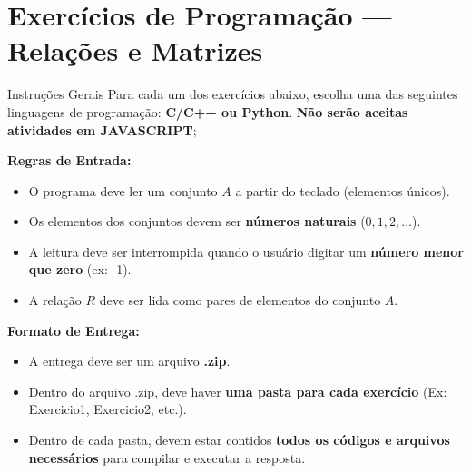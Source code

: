 \documentclass[12pt]{article}
\begin{document}
\vspace*{0.2cm}
\section*{Exercícios de Programação — Relações e Matrizes}

\begin{block}{Instruções Gerais}
Para cada um dos exercícios abaixo, escolha uma das seguintes linguagens de programação: \textbf{C/C++ ou Python}. 
\textbf{Não serão aceitas atividades em JAVASCRIPT};

\textbf{Regras de Entrada:}
\begin{itemize}
    \item O programa deve ler um conjunto $A$ a partir do teclado (elementos únicos).
    \item Os elementos dos conjuntos devem ser \textbf{números naturais} ($0, 1, 2, \dots$).
    \item A leitura deve ser interrompida quando o usuário digitar um \textbf{número menor que zero} (ex: -1).
    \item A relação $R$ deve ser lida como pares de elementos do conjunto $A$.
\end{itemize}

\textbf{Formato de Entrega:}
\begin{itemize}
    \item A entrega deve ser um arquivo \textbf{.zip}.
    \item Dentro do arquivo .zip, deve haver \textbf{uma pasta para cada exercício} (Ex: Exercicio1, Exercicio2, etc.).
    \item Dentro de cada pasta, devem estar contidos \textbf{todos os códigos e arquivos necessários} para compilar e executar a resposta.
\end{itemize}
\end{block}
\end{document}
